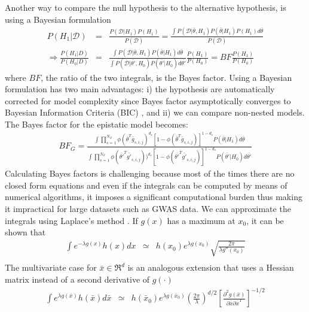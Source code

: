 Another way to compare the null hypothesis to the alternative hypothesis, is using a Bayesian formulation \cite{kass1995bayes, wakefield2009bayes}
\begin{eqnarray*}
	P(H_1 | \mathcal{D}) & = & \frac{ P( \mathcal{D} | H_1) P(H_1) }{ P(\mathcal{D}) } = \frac{ \int{ P(\mathcal{D} | \bar{\theta} , H_1) P( \bar{\theta} | H_1) P(H_1)  d\bar{\theta} } }{ P(\mathcal{D}) }  \\
	\Rightarrow  \frac{ P(H_1 | D)  }{ P(H_0 | D)  } & = & \frac{ \int{ P(\mathcal{D} | \bar{\theta} , H_1) P( \bar{\theta} | H_1)  d\bar{\theta} } }{\int{ P(\mathcal{D} | \bar{\theta'} , H_0 ) P( \bar{\theta'} | H_0)  d\bar{\theta'} } } \frac{ P(H_1) }{ P(H_0)  }  
	=  BF \frac{ P(H_1) }{ P(H_0)  }
\end{eqnarray*}
\noindent where $BF$, the ratio of the two integrals, is the Bayes factor. 
Using a Bayesian formulation has two main advantages: 
i) the hypothesis are automatically corrected for model complexity since Bayes factor asymptotically converges to Bayesian Information Criteria (BIC) \cite{kass1995bayes}, and 
ii) we can compare non-nested models. 
The Bayes factor for the epistatic model becomes:
\begin{eqnarray}\label{eq:bf2}
	BF_G = \frac
	{ \int{ \prod_{s=1}^{N_S}{ \phi( \bar{\theta}^T \bar{g}_{s,i,j})^{d_s} [ 1-\phi( \bar{\theta}^T \bar{g}_{s,i,j}) ]^{1-d_s} } P( \bar{\theta} | H_1)  d\bar{\theta} } }
	{ \int{ \prod_{s=1}^{N_S}{ 
	\phi( \bar{\theta'}^T \bar{g'}_{s,i,j} ) )^{d_s} 
	[ 1-\phi( \bar{\theta'}^T \bar{g'}_{s,i,j}) ]^{1-d_s} } 
	P( \bar{\theta'} | H_0)  
	d\bar{\theta'} } }
\end{eqnarray}
Calculating Bayes factors is challenging because most of the times there are no closed form equations and even if the integrals can be computed by means of numerical algorithms, it imposes a significant computational burden thus making it impractical for large datasets such as GWAS data.
We can approximate the integrals using Laplace's method  \cite{kass1995bayes}. If $g(x)$ has a maximum at $x_0$, it can be shown that
\begin{eqnarray*}
	\int{e^{-\lambda g(x)} h(x) dx} & \simeq & h(x_0) e^{\lambda g(x_0)} \sqrt{\frac{2 \pi}{\lambda g''(x_0)}} \\
\end{eqnarray*}
The multivariate case for $\bar{x} \in \Re^d$ is an analogous extension that uses a Hessian matrix instead of a second derivative of $g(\cdot)$
\begin{eqnarray}\label{eq:laplace}
	\int{e^{\lambda g(\bar{x})} h(\bar{x}) d\bar{x}} & \simeq & h(\bar{x}_0) e^{\lambda g(\bar{x}_0)} 
	\left( \frac{2 \pi}{\lambda} \right)^{d/2} \left[ \frac{\partial^2 g(\bar{x}) }{\partial \bar{x} \partial \bar{x}^T} \right] ^{-1/2}
\end{eqnarray}
